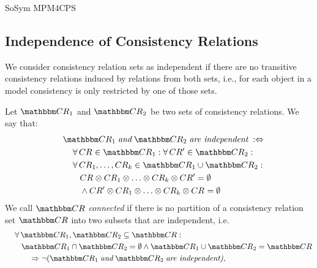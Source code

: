 \begin{copiedFrom}{SoSym MPM4CPS}
\subsection{Independence of Consistency Relations}

We consider consistency relation sets as independent if there are no transitive consistency relations induced by relations from both sets, i.e., for each object in a model consistency is only restricted by one of those sets.

\begin{definition}
    \label{def:independence}
    Let $\consistencyrelationset{CR}_{1}$ and $\consistencyrelationset{CR}_{2}$ be two sets of consistency relations. We say that:
    \begin{align*}
        \formulaskip &
        \consistencyrelationset{CR}_{1} \mathtext{and} \consistencyrelationset{CR}_{2} \mathtext{are independent} \equivalentperdefinition \\
        & \formulaskip
        \forall \consistencyrelation{CR}{} \in \consistencyrelationset{CR}_{1} : \forall \consistencyrelation{CR'}{} \in \consistencyrelationset{CR}_{2} : \\
        & \formulaskip 
        \forall \consistencyrelation{CR}{1}, \dots, \consistencyrelation{CR}{k} \in \consistencyrelationset{CR}_{1} \cup \consistencyrelationset{CR}_{2} : \\
        & \formulaskip\formulaskip
        \consistencyrelation{CR}{} \concat \consistencyrelation{CR}{1} \concat \dots \concat \consistencyrelation{CR}{k} \concat \consistencyrelation{CR'}{} = \emptyset \\
        & \formulaskip\formulaskip
        \land \consistencyrelation{CR'}{} \concat \consistencyrelation{CR}{1} \concat \dots \concat \consistencyrelation{CR}{k} \concat \consistencyrelation{CR}{} = \emptyset
    \end{align*}
    We call $\consistencyrelationset{CR}$ \emph{connected} if there is no partition of a consistency relation set $\consistencyrelationset{CR}$ into two subsets that are independent, i.e.
    \begin{align*}
        \formulaskip &
        \forall \consistencyrelationset{CR}_{1}, \consistencyrelationset{CR}_{2} \subseteq \consistencyrelationset{CR} : \\
        & \formulaskip 
        \consistencyrelationset{CR}_{1} \cap \consistencyrelationset{CR}_{2} = \emptyset \land \consistencyrelationset{CR}_{1} \cup \consistencyrelationset{CR}_{2} = \consistencyrelationset{CR}  \\
        & \formulaskip\formulaskip
        \Rightarrow \neg (\consistencyrelationset{CR}_{1} \mathtext{and} \consistencyrelationset{CR}_{2} \mathtext{are independent),}
    \end{align*}
\end{definition}


\end{copiedFrom}
